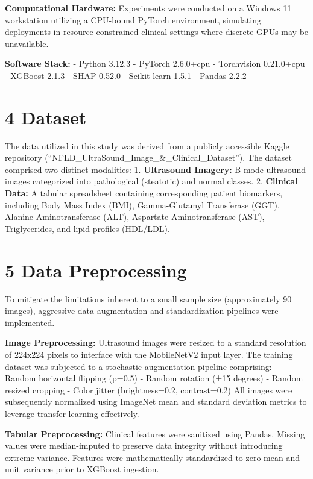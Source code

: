 \textbf{Computational Hardware:} Experiments were conducted on a Windows
11 workstation utilizing a CPU-bound PyTorch environment, simulating
deployments in resource-constrained clinical settings where discrete
GPUs may be unavailable.

\textbf{Software Stack:} - Python 3.12.3 - PyTorch 2.6.0+cpu -
Torchvision 0.21.0+cpu - XGBoost 2.1.3 - SHAP 0.52.0 - Scikit-learn
1.5.1 - Pandas 2.2.2

\section{4 Dataset}\label{dataset}

The data utilized in this study was derived from a publicly accessible
Kaggle repository (``NFLD\_UltraSound\_Image\_\&\_Clinical\_Dataset'').
The dataset comprised two distinct modalities: 1. \textbf{Ultrasound
Imagery:} B-mode ultrasound images categorized into pathological
(steatotic) and normal classes. 2. \textbf{Clinical Data:} A tabular
spreadsheet containing corresponding patient biomarkers, including Body
Mass Index (BMI), Gamma-Glutamyl Transferase (GGT), Alanine
Aminotransferase (ALT), Aspartate Aminotransferase (AST), Triglycerides,
and lipid profiles (HDL/LDL).

\section{5 Data Preprocessing}\label{data-preprocessing}

To mitigate the limitations inherent to a small sample size
(approximately 90 images), aggressive data augmentation and
standardization pipelines were implemented.

\textbf{Image Preprocessing:} Ultrasound images were resized to a
standard resolution of 224x224 pixels to interface with the MobileNetV2
input layer. The training dataset was subjected to a stochastic
augmentation pipeline comprising: - Random horizontal flipping (p=0.5) -
Random rotation (±15 degrees) - Random resized cropping - Color jitter
(brightness=0.2, contrast=0.2) All images were subsequently normalized
using ImageNet mean and standard deviation metrics to leverage transfer
learning effectively.

\textbf{Tabular Preprocessing:} Clinical features were sanitized using
Pandas. Missing values were median-imputed to preserve data integrity
without introducing extreme variance. Features were mathematically
standardized to zero mean and unit variance prior to XGBoost ingestion.

